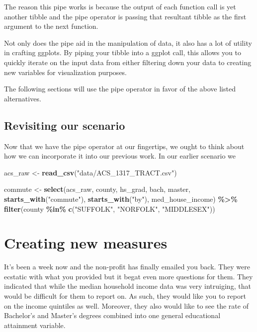\documentclass[
]{book}
\newenvironment{Shaded}{\begin{snugshade}}{\end{snugshade}}
\newcommand{\KeywordTok}[1]{\textcolor[rgb]{0.13,0.29,0.53}{\textbf{#1}}}
\newcommand{\NormalTok}[1]{#1}
\newcommand{\OperatorTok}[1]{\textcolor[rgb]{0.81,0.36,0.00}{\textbf{#1}}}
\newcommand{\StringTok}[1]{\textcolor[rgb]{0.31,0.60,0.02}{#1}}
\begin{document}
The reason this pipe works is because the output of each function call is yet another tibble and the pipe operator is passing that resultant tibble as the first argument to the next function.

Not only does the pipe aid in the manipulation of data, it also has a lot of utility in crafting ggplots. By piping your tibble into a ggplot call, this allows you to quickly iterate on the input data from either filtering down your data to creating new variables for visualization purposes.

The following sections will use the pipe operator in favor of the above listed alternatives.

\hypertarget{revisiting-our-scenario}{%
\section{Revisiting our scenario}\label{revisiting-our-scenario}}

Now that we have the pipe operator at our fingertips, we ought to think about how we can incorporate it into our previous work. In our earlier scenario we

\begin{Shaded}
\begin{Highlighting}[]
\NormalTok{acs\_raw \textless{}{-}}\StringTok{ }\KeywordTok{read\_csv}\NormalTok{(}\StringTok{"data/ACS\_1317\_TRACT.csv"}\NormalTok{)}

\NormalTok{commute \textless{}{-}}\StringTok{ }\KeywordTok{select}\NormalTok{(acs\_raw,}
\NormalTok{       county,}
\NormalTok{       hs\_grad, bach, master,}
       \KeywordTok{starts\_with}\NormalTok{(}\StringTok{"commute"}\NormalTok{),}
       \KeywordTok{starts\_with}\NormalTok{(}\StringTok{"by"}\NormalTok{),}
\NormalTok{       med\_house\_income) }\OperatorTok{\%\textgreater{}\%}\StringTok{ }
\StringTok{  }\KeywordTok{filter}\NormalTok{(county }\OperatorTok{\%in\%}\StringTok{ }\KeywordTok{c}\NormalTok{(}\StringTok{"SUFFOLK"}\NormalTok{, }\StringTok{"NORFOLK"}\NormalTok{, }\StringTok{"MIDDLESEX"}\NormalTok{))}
\end{Highlighting}
\end{Shaded}

\hypertarget{creating-new-measures}{%
\chapter{Creating new measures}\label{creating-new-measures}}

It's been a week now and the non-profit has finally emailed you back. They were ecstatic with what you provided but it begat even more questions for them. They indicated that while the median household income data was very intruiging, that would be difficult for them to report on. As such, they would like you to report on the income quintiles as well. Moreover, they also would like to see the rate of Bachelor's and Master's degrees combined into one general educational attainment variable.
\end{document}
